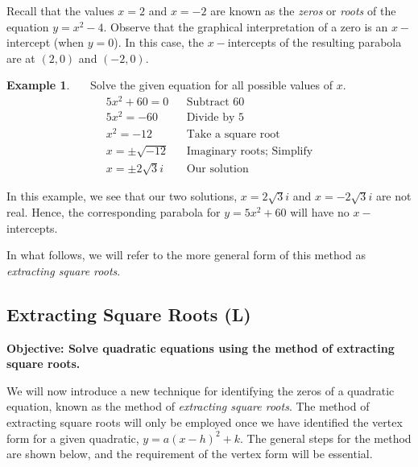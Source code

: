 \documentclass[12pt]{book}
\theoremstyle{definition}
\newtheorem{example}{Example}
\begin{document}
Recall that the values $x=2$ and $x=-2$ are known as the {\it zeros} or {\it roots} of the equation $y=x^2-4$.  Observe that the graphical interpretation of a zero is an $x-$intercept (when $y=0$).  In this case, the $x-$intercepts of the resulting parabola are at $(2,0)$ and $(-2,0)$.
\begin{example}~~~Solve the given equation for all possible values of $x$.
\begin{eqnarray*}
5x^2+60=0 & & \text{Subtract \ 60}\\
5x^2=-60 & & \text{Divide \ by \ 5}\\
x^2=-12 & & \text{Take \ a \ square \ root}\\
x=\pm \sqrt{-12} & & \text{Imaginary \ roots; Simplify}\\
x=\pm 2\sqrt{3}i & & \text{Our \ solution}
\end{eqnarray*}
\end{example}
In this example, we see that our two solutions, $x=2\sqrt{3}i$ and $x=-2\sqrt{3}i$ are not real.  Hence, the corresponding parabola for $y=5x^2+60$ will have no $x-$intercepts.\par
In what follows, we will refer to the more general form of this method as {\it extracting square roots}.
\subsection{Extracting Square Roots (L)}
{\bf Objective: Solve quadratic equations using the method of extracting square roots.}\par

We will now introduce a new technique for identifying the zeros of a quadratic equation, known as the method of {\it extracting square roots}.  The method of extracting square roots will only be employed once we have identified the vertex form for a given quadratic, $y=a(x-h)^2+k$.  The general steps for the method are shown below, and the requirement of the vertex form will be essential.
\end{document}
